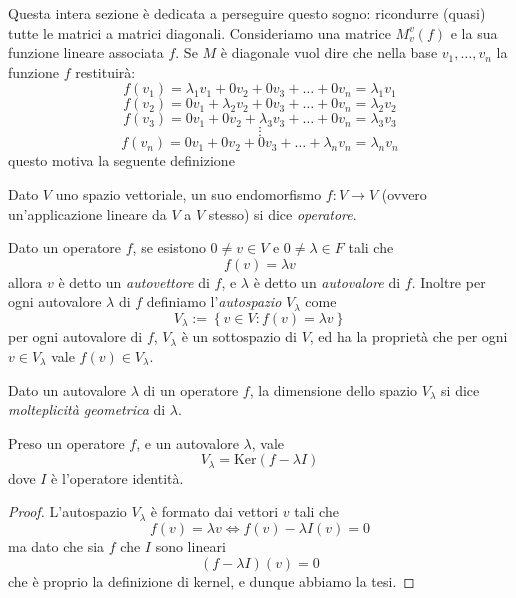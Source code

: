 \documentclass[11pt]{scrartcl}
\renewcommand{\ker}[1]{\text{Ker}\left(#1\right)}
\begin{document}
   	 Questa intera sezione è dedicata a perseguire questo sogno: ricondurre (quasi) tutte le matrici a matrici diagonali. Consideriamo una matrice $M_v^v(f)$ e la sua funzione lineare associata $f$. Se $M$ è diagonale vuol dire che nella base $v_1,\dots, v_n$ la funzione $f$ restituirà:
   	 $$f(v_1)=\lambda_1v_1+0v_2+0v_3+\dots+0v_n=\lambda_1v_1$$
   	 $$f(v_2)=0v_1 + \lambda_2v_2+0v_3+\dots +0v_n=\lambda_2v_2$$
   	 $$f(v_3)=0v_1+0v_2+\lambda_3v_3+\dots+0v_n=\lambda_3v_3$$
   	 $$\vdots$$
   	 $$f(v_n)=0v_1+0v_2+0v_3+\dots+\lambda_n v_n=\lambda_nv_n$$
   	 questo motiva la seguente definizione
   	 \begin{definition}[Operatore]
   	 	Dato $V$ uno spazio vettoriale, un suo endomorfismo $f:V\to V$ (ovvero un'applicazione lineare da $V$ a $V$ stesso) si dice \textit{operatore}.
   	 \end{definition}
   	 \begin{definition}
   	 	Dato un operatore $f$, se esistono $0\ne v\in V$ e $0\ne \lambda\in F$ tali che 
   	 	$$f(v)=\lambda v$$
   	 	allora $v$ è detto un \textit{autovettore} di $f$, e $\lambda$ è detto un \textit{autovalore} di $f$. Inoltre per ogni autovalore $\lambda$ di $f$ definiamo l'\textit{autospazio} $V_\lambda$ come
   	 	$$V_\lambda:=\left\{v\in V:f(v)=\lambda v\right\}$$
   	 	per ogni autovalore di $f$, $V_\lambda$ è un sottospazio di $V$, ed ha la proprietà che per ogni $v\in V_\lambda$ vale $f(v)\in V_\lambda$. 
   	 \end{definition}
   	 \begin{definition}
   	 	Dato un autovalore $\lambda$ di un operatore $f$, la dimensione dello spazio $V_\lambda$ si dice \textit{molteplicità geometrica} di $\lambda$.
   	 \end{definition}
   	 \begin{proposition}
   	 	Preso un operatore $f$, e un autovalore $\lambda$, vale
   	 	$$V_\lambda=\ker{f-\lambda I}$$
   	 	dove $I$ è l'operatore identità.
   	 \end{proposition}
   	 \begin{proof}
   	 	L'autospazio $V_\lambda$ è formato dai vettori $v$ tali che 
   	 	$$f(v)=\lambda v \iff f(v)-\lambda I(v)=0$$
   	 	ma dato che sia $f$ che $I$ sono lineari
   	 	$$\left(f-\lambda I\right)(v)=0$$
   	 	che è proprio la definizione di kernel, e dunque abbiamo la tesi.
   	 \end{proof}
\end{document}
